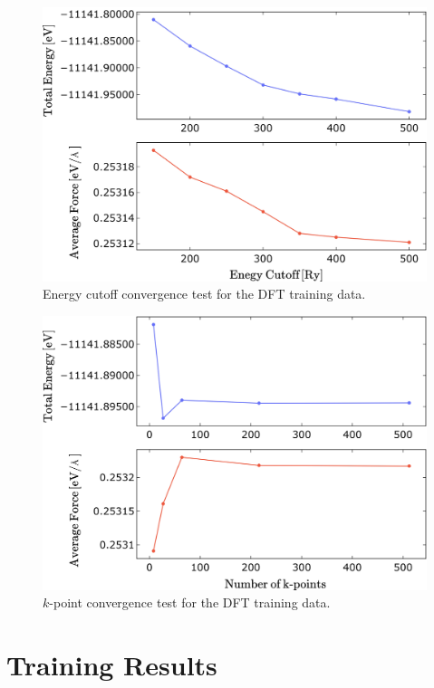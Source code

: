 \begin{figure}
  \begin{center}
    \includegraphics[width=.8\textwidth]{
      asset/cutoff_convergence.jpg
    }
  \end{center}
  \caption{Energy cutoff convergence test for the DFT training data.}
  \label{fig:dft_energy_cutoff_convergence}
\end{figure}

\begin{figure}
  \begin{center}
    \includegraphics[width=.8\textwidth]{
      asset/kpoint_convergence.jpg
    }
  \end{center}
  \caption{$k$-point convergence test for the DFT training data.}
  \label{fig:dft_kpoint_convergence}
\end{figure}

\section{Training Results}

